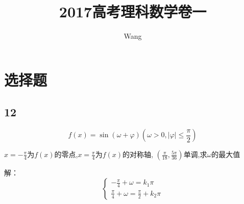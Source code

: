 \documentclass[UTF8]{ctexart}
\title{2017高考理科数学卷一}
\author{Wang}
\begin{document}
    \maketitle
    \section{选择题}
    \subsection{12}
    \[f(x)=\sin(\omega+\varphi)(\omega>0,|\varphi|\leq \frac{\pi}{2})\]

    $x=-\frac{\pi}{4}$为$f(x)$的零点,$x=\frac{\pi}{4}$为$f(x)$的对称轴,
    $(\frac{\pi}{18},\frac{5\pi}{36})$单调,求$\omega$的最大值

    解：
    \begin{equation}
        \left\{
            \begin{align}
                -\frac{\pi}{4}+\omega =k_1\pi \\
                \frac{\pi}{4}+\omega =\frac{\pi}{2}+k_2\pi           
            \end{align}
        \right.
    \end{equation}
    
   
\end{document}

